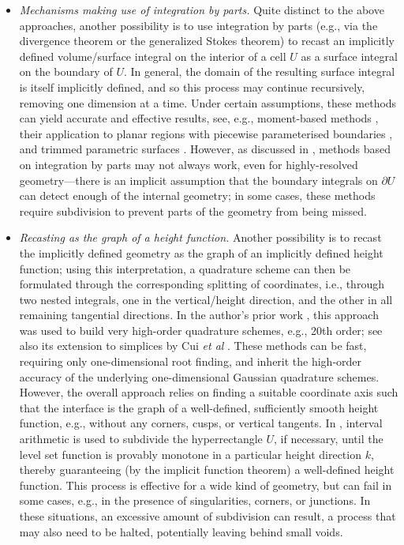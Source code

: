 \documentclass[onefignum,onetabnum,onealgnum,oneeqnum]{siamart190516}
\begin{document}
\begin{itemize}
%

\item \textit{Mechanisms making use of integration by parts.} Quite distinct to the above approaches, another possibility is to use integration by parts (e.g., via the divergence theorem or the generalized Stokes theorem) to recast an implicitly defined volume/surface integral on the interior of a cell $U$ as a surface integral on the boundary of $U$. In general, the domain of the resulting surface integral is itself implicitly defined, and so this process may continue recursively, removing one dimension at a time. Under certain assumptions, these methods can yield accurate and effective results, see, e.g., moment-based methods \cite{MullerKummerOberlack,10.2140/camcos.2015.10.83}, their application to planar regions with piecewise parameterised boundaries \cite{SOMMARIVA2009886,GUNDERMAN2021102944}, and trimmed parametric surfaces \cite{gunderman2021highaccuracy}. However, as discussed in \cite{HighorderImplicitQuad}, methods based on integration by parts may not always work, even for highly-resolved geometry---there is an implicit assumption that the boundary integrals on $\partial U$ can detect enough of the internal geometry; in some cases, these methods require subdivision to prevent parts of the geometry from being missed.

%

\item \textit{Recasting as the graph of a height function.} Another possibility is to recast the implicitly defined geometry as the graph of an implicitly defined height function; using this interpretation, a quadrature scheme can then be formulated through the corresponding splitting of coordinates, i.e., through two nested integrals, one in the vertical/height direction, and the other in all remaining tangential directions. In the author's prior work \cite{HighorderImplicitQuad,algoim}, this approach was used to build very high-order quadrature schemes, e.g., 20th order; see also its extension to simplices by Cui \textit{et al} \cite{10.1145/3372144}. These methods can be fast, requiring only one-dimensional root finding, and inherit the high-order accuracy of the underlying one-dimensional Gaussian quadrature schemes. However, the overall approach relies on finding a suitable coordinate axis such that the interface is the graph of a well-defined, sufficiently smooth height function, e.g., without any corners, cusps, or vertical tangents. In \cite{HighorderImplicitQuad,algoim}, interval arithmetic is used to subdivide the hyperrectangle $U$, if necessary, until the level set function is provably monotone in a particular height direction $k$, thereby guaranteeing (by the implicit function theorem) a well-defined height function. This process is effective for a wide kind of geometry, but can fail in some cases, e.g., in the presence of singularities, corners, or junctions. In these situations, an excessive amount of subdivision can result, a process that may also need to be halted, potentially leaving behind small voids. 
\end{itemize}
\end{document}
